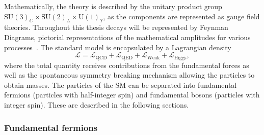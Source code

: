 Mathematically, the theory is described by the unitary product group $\text{SU}(3)_{C}\times\text{SU}(2)_{L}\times\text{U}(1)_{Y}$, as the components are represented as gauge field theories. Throughout this thesis decays will be represented by Feynman Diagrams, pictorial representations of the mathematical amplitudes for various processes~\cite{PhysRev.76.749}.  
The standard model is encapsulated by a Lagrangian density
\begin{equation}
\mathcal{L} = \mathcal{L}_{\text{QCD}}+\mathcal{L}_{\text{QED}}+\mathcal{L}_{\text{Weak}}+\mathcal{L}_{\text{Higgs}},
\end{equation}
where the total quantity receives contributions from the fundamental forces as well as the spontaneous symmetry breaking mechanism allowing the particles to obtain masses. 
The particles of the SM can be separated into fundamental fermions (particles with half-integer spin) and fundamental bosons (particles with integer spin). These are described in the following sections.  


\subsubsection{Fundamental fermions}

